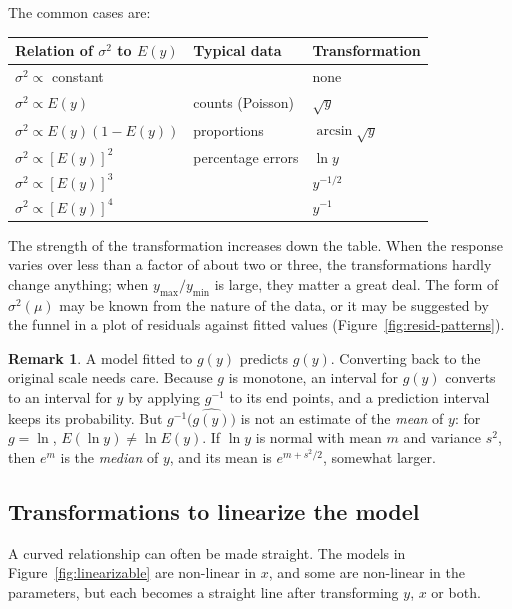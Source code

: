 \documentclass[11pt,a4paper]{article}
\numberwithin{equation}{section}
\theoremstyle{definition}
\newtheorem*{remark}{Remark}
\begin{document}
The common cases are:
\begin{center}
\begin{tabular}{lll}
Relation of $\sigma^2$ to $E(y)$ & Typical data & Transformation \\
\hline
$\sigma^2 \propto$ constant & & none \\
$\sigma^2 \propto E(y)$ & counts (Poisson) & $\sqrt{y}$ \\
$\sigma^2 \propto E(y)(1 - E(y))$ & proportions & $\arcsin\sqrt{y}$ \\
$\sigma^2 \propto [E(y)]^2$ & percentage errors & $\ln y$ \\
$\sigma^2 \propto [E(y)]^3$ & & $y^{-1/2}$ \\
$\sigma^2 \propto [E(y)]^4$ & & $y^{-1}$ \\
\end{tabular}
\end{center}
The strength of the transformation increases down the table. When the response varies over
less than a factor of about two or three, the transformations hardly change anything; when
$y_{\max}/y_{\min}$ is large, they matter a great deal. The form of $\sigma^2(\mu)$ may be known
from the nature of the data, or it may be suggested by the funnel in a plot of residuals
against fitted values (Figure~\ref{fig:resid-patterns}).

\begin{remark}
A model fitted to $g(y)$ predicts $g(y)$. Converting back to the original scale needs care.
Because $g$ is monotone, an interval for $g(y)$ converts to an interval for $y$ by applying
$g^{-1}$ to its end points, and a prediction interval keeps its probability. But
$g^{-1}\bigl(\widehat{g(y)}\bigr)$ is not an estimate of the \emph{mean} of $y$: for
$g = \ln$, $E(\ln y) \neq \ln E(y)$. If $\ln y$ is normal with mean $m$ and variance $s^2$,
then $e^m$ is the \emph{median} of $y$, and its mean is $e^{m + s^2/2}$, somewhat larger.
\end{remark}

\subsection{Transformations to linearize the model}
A curved relationship can often be made straight. The models in Figure~\ref{fig:linearizable}
are non-linear in $x$, and some are non-linear in the parameters, but each becomes a straight
line after transforming $y$, $x$ or both.
\end{document}
